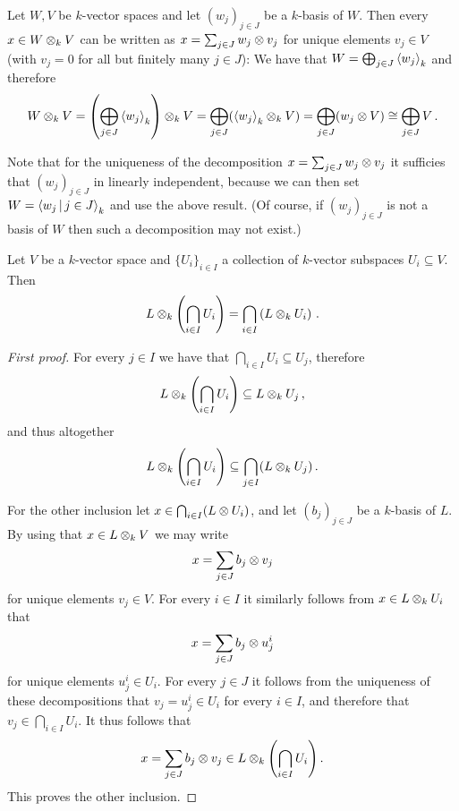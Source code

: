 \begin{recall}
  \label{recall: unique representation in tensor product}
  Let $W, V$ be $k$-vector spaces and let $(w_j)_{j \in J}$ be a $k$-basis of $W$.
  Then every $x \in W \mathbin{\otimes}_k V$ can be written as $x = \sum_{j \in J} w_j \mathbin{\otimes} v_j$ for unique elements $v_j \in V$ (with $v_j = 0$ for all but finitely many $j \in J$):
  We have that $W = \bigoplus_{j \in J} \left\langle w_j \right\rangle_k$ and therefore
  \[
          W \mathbin{\otimes}_k V
    =     \left( \bigoplus_{j \in J} \left\langle w_j \right\rangle_k \right) \mathbin{\otimes}_k V
    =     \bigoplus_{j \in J} ( \left\langle w_j \right\rangle_k \mathbin{\otimes}_k V )
    =     \bigoplus_{j \in J} (w_j \mathbin{\otimes} V)
    \cong \bigoplus_{j \in J} V \,.
  \]
  
  Note that for the uniqueness of the decomposition $x = \sum_{j \in J} w_j \mathbin{\otimes} v_j$ it sufficies that $(w_j)_{j \in J}$ in linearly independent, because we can then set $W = \gen{w_j \suchthat j \in J}_k$ and use the above result.
  (Of course, if $(w_j)_{j \in J}$ is not a basis of $W$ then such a decomposition may not exist.)
\end{recall}


\begin{corollary}
  Let $V$ be a $k$-vector space and $\{U_i\}_{i \in I}$ a collection of $k$-vector subspaces $U_i \subseteq V$.
  Then
  \[
      L \mathbin{\otimes}_k \left( \bigcap_{i \in I} U_i \right)
    = \bigcap_{i \in I} \left( L \mathbin{\otimes}_k U_i \right) \,.
  \]
\end{corollary}


\begin{proof}[First proof]
  For every $j \in I$ we have that $\bigcap_{i \in I} U_i \subseteq U_j$, therefore
  \[
              L \mathbin{\otimes}_k \left( \bigcap_{i \in I} U_i \right)
    \subseteq L \mathbin{\otimes}_k U_j \,,
  \]
  and thus altogether
  \[
              L \mathbin{\otimes}_k \left( \bigcap_{i \in I} U_i \right)
    \subseteq \bigcap_{j \in I} (L \mathbin{\otimes}_k U_j) \,.
  \]
  
  For the other inclusion let $x \in \bigcap_{i \in I} (L \mathbin{\otimes} U_i)$, and let $(b_j)_{j \in J}$ be a $k$-basis of $L$.
  By using that $x \in L \mathbin{\otimes}_k V$ we may write
  \[
      x
    = \sum_{j \in J} b_j \mathbin{\otimes} v_j
  \]
  for unique elements $v_j \in V$.
  For every $i \in I$ it similarly follows from $x \in L \mathbin{\otimes}_k U_i$ that
  \[
      x
    = \sum_{j \in J} b_j \mathbin{\otimes} u^i_j
  \]
  for unique elements $u^i_j \in U_i$.
  For every $j \in J$ it follows from the uniqueness of these decompositions that $v_j = u^i_j \in U_i$ for every $i \in I$, and therefore that $v_j \in \bigcap_{i \in I} U_i$.
  It thus follows that
  \[
        x
    =   \sum_{j \in J} b_j \mathbin{\otimes} v_j
    \in L \mathbin{\otimes}_k \left( \bigcap_{i \in I} U_i \right).
  \]
  This proves the other inclusion.
\end{proof}





